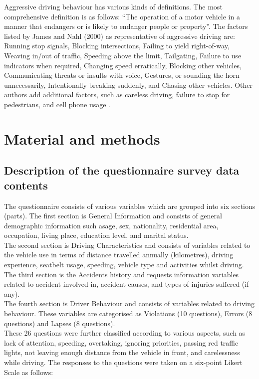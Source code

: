 \documentclass[preprint,12pt,a4paper,authoryear]{elsarticle}
\begin{document}
\begin{linenumbers}
Aggressive driving behaviour has various kinds of definitions. The most comprehensive definition is as follows: “The operation of a motor vehicle in a manner that endangers or is likely to endanger people or property”.  The factors listed by James and Nahl (2000) as representative of aggressive driving are: Running stop signals, Blocking intersections, Failing to yield right-of-way, Weaving in/out of traffic, Speeding above the limit, Tailgating, Failure to use indicators when required, Changing speed erratically, Blocking other vehicles, Communicating threats or insults with voice, Gestures, or sounding the horn unnecessarily, Intentionally breaking suddenly, and Chasing other vehicles. Other authors add additional factors, such as careless driving, failure to stop for pedestrians, and cell phone usage  \citep{James2000}.

\section{Material and methods}

\subsection{Description of the questionnaire survey data contents}
 The questionnaire consists of various variables which are grouped into six sections (parts). The first section is General Information and consists of general demographic information such asage, sex, nationality, residential area, occupation, living place, education level, and marital status. \\
The second section is Driving Characteristics and consists of variables related to the vehicle use in terms of distance travelled annually (kilometres), driving experience, seatbelt usage, speeding, vehicle type and activities  whilst driving. 
\\ 
The third section is the Accidents history and requests information variables related to accident involved in, accident causes, and types of injuries suffered (if any).
\\
The fourth section is Driver Behaviour and consists of variables related to driving behaviour. These variables are categorised as Violations (10 questions), Errors (8 questions) and Lapses (8 questions). 
\\
These 26 questions were further classified according to various aspects, such as lack of attention, speeding, overtaking, ignoring priorities, passing red traffic lights, not leaving enough distance from the vehicle in front, and carelessness while driving. The responses to the questions were taken on a six-point Likert Scale as follows: 


\end{linenumbers}
\end{document}

